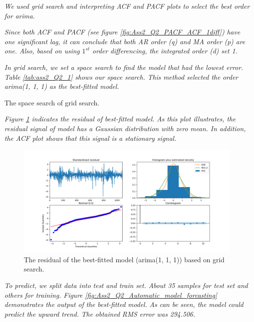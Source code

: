 \textit{We used grid search and interpreting \gls{ACF} and \gls{PACF} plots to select the best order for \gls{arima}.}

\textit{Since both \gls{ACF} and \gls{PACF} (see figure \ref{fig:Ass2_Q2_PACF_ACF_1diff}) have one significant lag, it can conclude that both AR order (q) and MA order (p) are one. Also, based on using $1^{st}$ order differencing, the integrated order (d) set 1.}

\textit{In grid search, we set a space search to find the model that had the lowest error. Table \ref{tab:ass2_Q2_1} shows our space search. This method selected the order \gls{arima}(1, 1, 1) as the best-fitted model.}

\begin{table}[H]
\centering
\caption{The space search of grid search.}
\label{tab:ass2_Q2_1}

\end{table}

\textit{Figure \ref{fig:Ass2_Q2_best_model_residual} indicates the residual of best-fitted model. As this plot illustrates, the residual signal of model has a Gaussian distribution with zero mean. In addition, the \gls{ACF} plot shows that this signal is a stationary signal.}



\begin{figure}[H]
    \centering
    \begin{minipage}[b]{1\textwidth}
        \includegraphics[width=\textwidth]{manuscript/src/figures/Ass2/Ass2_Q2_best_model_residual.png}
    \end{minipage}
    \caption{The residual  of the best-fitted model (\gls{arima}(1, 1, 1)) based on grid search.}
    \label{fig:Ass2_Q2_best_model_residual}
\end{figure}

  
\textit{To predict, we split data into test and train set. About 35 samples for test set and others for training. Figure \ref{fig:Ass2_Q2_Automatic_model_forcasting} demonstrates the output of the best-fitted model. As can be seen, the model could predict the upward trend. The obtained RMS error was 294.506.}

